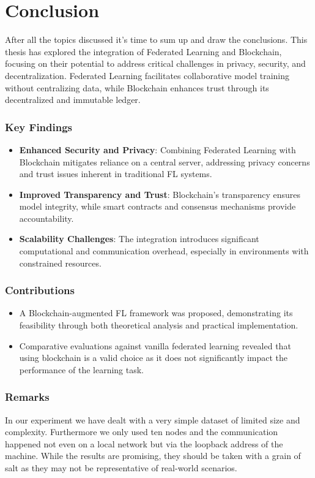 \chapter*{Conclusion}\label{chap:conclusion}
After all the topics discussed it's time to sum up and draw the conclusions.
This thesis has explored the integration of Federated Learning and Blockchain, focusing on
their potential to address critical challenges in privacy, security, and decentralization.
Federated Learning facilitates collaborative model training without centralizing data, while Blockchain
enhances trust through
its decentralized and immutable ledger.

\subsection*{Key Findings}
\begin{itemize}
  \item \textbf{Enhanced Security and Privacy}: Combining Federated Learning with Blockchain mitigates
    reliance on a central
    server, addressing privacy concerns and trust issues inherent in traditional FL systems.
  \item \textbf{Improved Transparency and Trust}: Blockchain's transparency ensures model integrity, while
    smart contracts and consensus mechanisms provide accountability.
  \item \textbf{Scalability Challenges}: The integration introduces significant computational and
    communication overhead, especially in environments with constrained resources.
\end{itemize}

\subsection*{Contributions}
\begin{itemize}
  \item A Blockchain-augmented FL framework was proposed, demonstrating its feasibility through both
    theoretical analysis and practical implementation.
  \item Comparative evaluations against vanilla federated learning revealed that using blockchain is a valid
    choice as it does not significantly impact the performance of the learning task.
\end{itemize}

\subsection*{Remarks}
In our experiment we have dealt with a very simple dataset of limited size and complexity. Furthermore we
only used ten nodes and the communication happened not even on a local network but via the loopback address
of the machine. While the results are promising, they should be taken with a grain of salt as they may not be
representative of
real-world scenarios.

